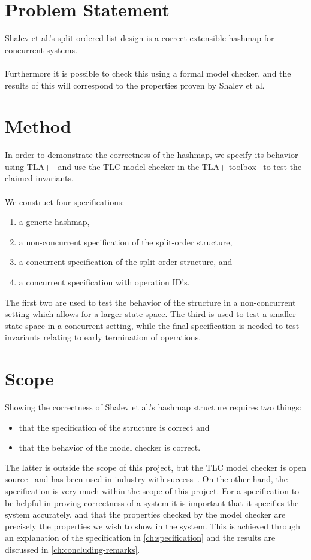 \documentclass{uit-thesis}
\begin{document}
\section{Problem Statement}\label{sec:problem-statement}
Shalev et al.'s split-ordered list design is a correct extensible hashmap for concurrent systems.
\\\\
Furthermore it is possible to check this using a formal model checker, and the results of this will correspond to the properties proven by Shalev et al.

\section{Method}
In order to demonstrate the correctness of the hashmap, we specify its behavior using TLA+~\cite{Lamport_specifying_2002} and use the TLC model checker in the TLA+ toolbox~\cite{TLAplus} to test the claimed invariants.
\\\\
We construct four specifications:
\begin{enumerate}
    \item a generic hashmap,
    \item a non-concurrent specification of the split-order structure,
    \item a concurrent specification of the split-order structure, and
    \item a concurrent specification with operation ID's.
\end{enumerate}
The first two are used to test the behavior of the structure in a non-concurrent setting which allows for a larger state space. The third is used to test a smaller state space in a concurrent setting, while the final specification is needed to test invariants relating to early termination of operations.

\section{Scope}
Showing the correctness of Shalev et al.'s hashmap structure requires two things:
\begin{itemize}[label={}]
    \item that the specification of the structure is correct and
    \item that the behavior of the model checker is correct.
\end{itemize}
The latter is outside the scope of this project, but the TLC model checker is open source~\cite{TLAplus} and has been used in industry with success~\cite{Amazon2015, Lamport-Batson2002}. On the other hand, the specification is very much within the scope of this project. For a specification to be helpful in proving correctness of a system it is important that it specifies the system accurately, and that the properties checked by the model checker are precisely the properties we wish to show in the system. This is achieved through an explanation of the specification in \autoref{ch:specification} and the results are discussed in \autoref{ch:concluding-remarks}.
\end{document}
